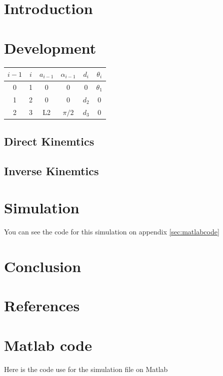 \documentclass[12pt]{article}
\begin{document}
    \section{Introduction}

    \section{Development}
    \begin{table}[h]
        \begin{center}
            \begin{tabular}{c c c c c c}
                \hline
                $i-1$ & $i$ & $a_{i-1}$ & $\alpha_{i-1}$ & $d_i$ & $\theta_i$\\
                \hline
                0 & 1 & 0 & 0 & 0 & $\theta_1$\\
                1 & 2 & 0 & 0 & $d_2$ & 0\\
                2 & 3 & L2 & $\pi / 2$ & $d_3$ & 0\\
                \hline
            \end{tabular}
        \end{center}
        \label{table:DH_table}
    \end{table}
        \subsection{Direct Kinemtics}
        \subsection{Inverse Kinemtics}

    \section{Simulation}
    You can see the code for this simulation on appendix \ref{sec:matlabcode}
    \section{Conclusion}

    \pagebreak
    \section*{References}
    \printbibliography

    \pagebreak
    \appendix
    \section{Matlab code}
    Here is the code use for the simulation file on Matlab


    \label{sec:matlabcode}
    
\end{document}
